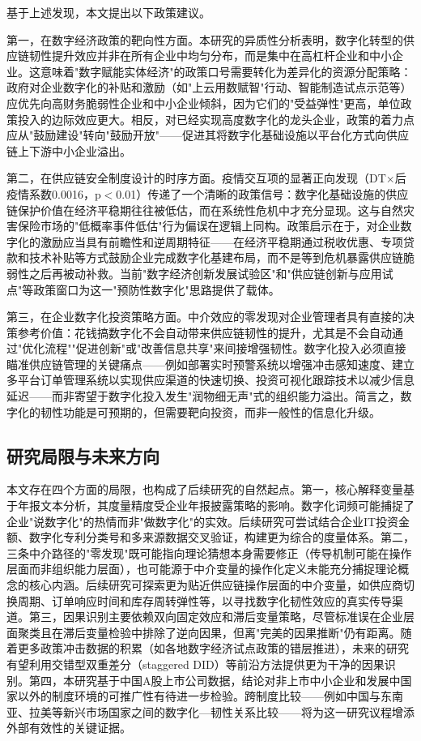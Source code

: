 基于上述发现，本文提出以下政策建议。

第一，在数字经济政策的靶向性方面。本研究的异质性分析表明，数字化转型的供应链韧性提升效应并非在所有企业中均匀分布，而是集中在高杠杆企业和中小企业。这意味着"数字赋能实体经济"的政策口号需要转化为差异化的资源分配策略：政府对企业数字化的补贴和激励（如"上云用数赋智"行动、智能制造试点示范等）应优先向高财务脆弱性企业和中小企业倾斜，因为它们的"受益弹性"更高，单位政策投入的边际效应更大。相反，对已经实现高度数字化的龙头企业，政策的着力点应从"鼓励建设"转向"鼓励开放"——促进其将数字化基础设施以平台化方式向供应链上下游中小企业溢出。

第二，在供应链安全制度设计的时序方面。疫情交互项的显著正向发现（DT$\times$后疫情系数0.0016，p$<$0.01）传递了一个清晰的政策信号：数字化基础设施的供应链保护价值在经济平稳期往往被低估，而在系统性危机中才充分显现。这与自然灾害保险市场的"低概率事件低估"行为偏误在逻辑上同构。政策启示在于，对企业数字化的激励应当具有前瞻性和逆周期特征——在经济平稳期通过税收优惠、专项贷款和技术补贴等方式鼓励企业完成数字化基建布局，而不是等到危机暴露供应链脆弱性之后再被动补救。当前"数字经济创新发展试验区"和"供应链创新与应用试点"等政策窗口为这一"预防性数字化"思路提供了载体。

第三，在企业数字化投资策略方面。中介效应的零发现对企业管理者具有直接的决策参考价值：花钱搞数字化不会自动带来供应链韧性的提升，尤其是不会自动通过"优化流程""促进创新"或"改善信息共享"来间接增强韧性。数字化投入必须直接瞄准供应链管理的关键痛点——例如部署实时预警系统以增强冲击感知速度、建立多平台订单管理系统以实现供应渠道的快速切换、投资可视化跟踪技术以减少信息延迟——而非寄望于数字化投入发生"润物细无声"式的组织能力溢出。简言之，数字化的韧性功能是可预期的，但需要靶向投资，而非一般性的信息化升级。

\subsection{研究局限与未来方向}

本文存在四个方面的局限，也构成了后续研究的自然起点。第一，核心解释变量基于年报文本分析，其度量精度受企业年报披露策略的影响。数字化词频可能捕捉了企业"说数字化"的热情而非"做数字化"的实效。后续研究可尝试结合企业IT投资金额、数字化专利分类号和多来源数据交叉验证，构建更为综合的度量体系。第二，三条中介路径的"零发现"既可能指向理论猜想本身需要修正（传导机制可能在操作层面而非组织能力层面），也可能源于中介变量的操作化定义未能充分捕捉理论概念的核心内涵。后续研究可探索更为贴近供应链操作层面的中介变量，如供应商切换周期、订单响应时间和库存周转弹性等，以寻找数字化韧性效应的真实传导渠道。第三，因果识别主要依赖双向固定效应和滞后变量策略，尽管标准误在企业层面聚类且在滞后变量检验中排除了逆向因果，但离"完美的因果推断"仍有距离。随着更多政策冲击数据的积累（如各地数字经济试点政策的错层推进），未来的研究有望利用交错型双重差分（staggered DID）等前沿方法提供更为干净的因果识别。第四，本研究基于中国A股上市公司数据，结论对非上市中小企业和发展中国家以外的制度环境的可推广性有待进一步检验。跨制度比较——例如中国与东南亚、拉美等新兴市场国家之间的数字化—韧性关系比较——将为这一研究议程增添外部有效性的关键证据。